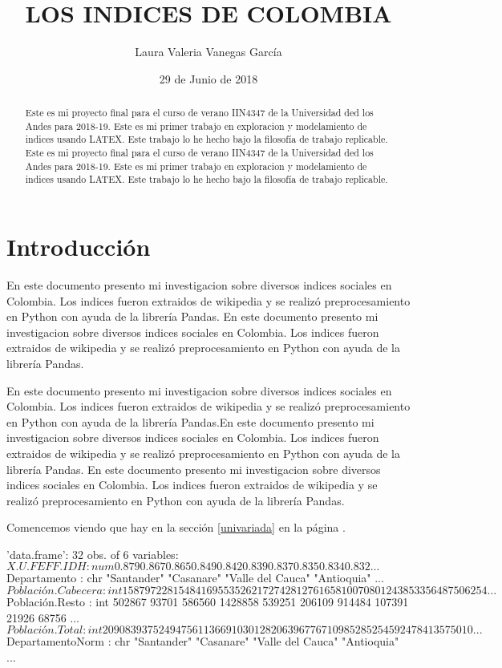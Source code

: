 \documentclass{article}
\title{LOS INDICES DE COLOMBIA}
\author[1]{\normalsize Laura Valeria Vanegas García}
\affil[1]{\small  Facultad de Ingeniería,Universidad de los Andes\\
\texttt{{lv.vanegas10}@uniandes.edu.co}}
\date{29 de Junio de 2018}
\begin{document}


\maketitle

\begin{abstract}
Este es mi proyecto final para el curso de verano IIN4347 de la Universidad ded los Andes para 2018-19. Este es mi primer trabajo en exploracion y modelamiento de indices usando LATEX. Este trabajo lo he hecho bajo la filosofía de trabajo replicable. Este es mi proyecto final para el curso de verano IIN4347 de la Universidad ded los Andes para 2018-19. Este es mi primer trabajo en exploracion y modelamiento de indices usando LATEX. Este trabajo lo he hecho bajo la filosofía de trabajo replicable.
\end{abstract}

\section*{Introducción}

En este documento presento mi investigacion sobre diversos indices sociales en Colombia. Los indices fueron extraidos de wikipedia y se realizó preprocesamiento en Python con ayuda de la librería Pandas. En este documento presento mi investigacion sobre diversos indices sociales en Colombia. Los indices fueron extraidos de wikipedia y se realizó preprocesamiento en Python con ayuda de la librería Pandas. 

En este documento presento mi investigacion sobre diversos indices sociales en Colombia. Los indices fueron extraidos de wikipedia y se realizó preprocesamiento en Python con ayuda de la librería Pandas.En este documento presento mi investigacion sobre diversos indices sociales en Colombia. Los indices fueron extraidos de wikipedia y se realizó preprocesamiento en Python con ayuda de la librería Pandas. En este documento presento mi investigacion sobre diversos indices sociales en Colombia. Los indices fueron extraidos de wikipedia y se realizó preprocesamiento en Python con ayuda de la librería Pandas.

Comencemos viendo que hay en la sección \ref{univariada} en la página \pageref{univariada}.

\clearpage

\begin{Schunk}
\begin{Soutput}
'data.frame':	32 obs. of  6 variables:
 $ X.U.FEFF.IDH      : num  0.879 0.867 0.865 0.849 0.842 0.839 0.837 0.835 0.834 0.832 ...
 $ Departamento      : chr  "Santander" "Casanare" "Valle del Cauca" "Antioquia" ...
 $ Población.Cabecera: int  1587972 281548 4169553 5262172 742812 761658 10070801 2438533 56487 506254 ...
 $ Población.Resto   : int  502867 93701 586560 1428858 539251 206109 914484 107391 21926 68756 ...
 $ Población.Total   : int  2090839 375249 4756113 6691030 1282063 967767 10985285 2545924 78413 575010 ...
 $ DepartamentoNorm  : chr  "Santander" "Casanare" "Valle del Cauca" "Antioquia" ...
\end{Soutput}
\end{Schunk}
\end{document}
